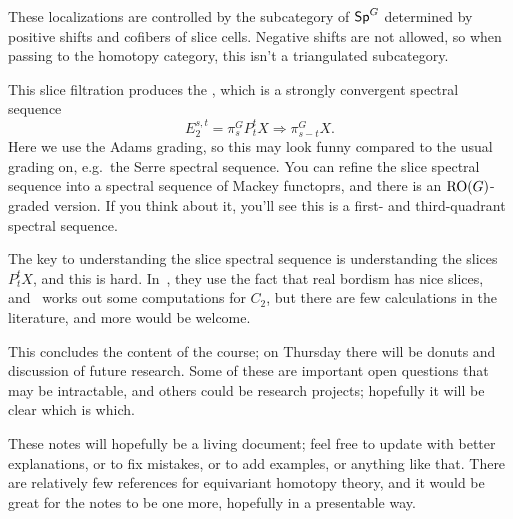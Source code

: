 These localizations are controlled by the subcategory of $\mathsf{Sp}^G$ determined by positive shifts and cofibers of
slice cells. Negative shifts are not allowed, so when passing to the homotopy category, this isn't a triangulated
subcategory.

This slice filtration produces the , which is a strongly convergent spectral sequence
\[E_2^{s,t} = \pi_s^G P_t^tX\Longrightarrow \pi_{s-t}^G X.\]
Here we use the Adams grading, so this may look funny compared to the usual grading on, e.g.\ the Serre spectral
sequence. You can refine the slice spectral sequence into a spectral sequence of Mackey functoprs, and there is an
$\mathrm{RO}(G)$-graded version. If you think about it, you'll see this is a first- and third-quadrant spectral sequence.

The key to understanding the slice spectral sequence is understanding the slices $P_t^tX$, and this is hard.
In~\cite{HHR}, they use the fact that real bordism has nice slices, and~ works out some computations
for $C_2$, but there are few calculations in the literature, and more would be welcome.

This concludes the content of the course; on Thursday there will be donuts and discussion of future research. Some
of these are important open questions that may be intractable, and others could be research projects; hopefully
it will be clear which is which.

These notes will hopefully be a living document; feel free to update with better explanations, or to fix mistakes,
or to add examples, or anything like that. There are relatively few references for equivariant homotopy theory, and
it would be great for the notes to be one more, hopefully in a presentable way.
